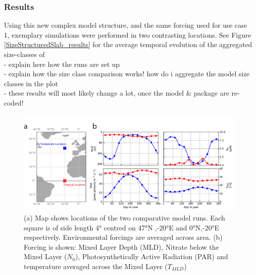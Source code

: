 \documentclass[template.tex]{subfiles}
\begin{document}
\subsubsection{Results}

Using this new complex model structure, and the same forcing used for use case 1, exemplary simulations were performed in two contrasting locations. 
See Figure \ref{SizeStructuredSlab_results} for the average temporal evolution of the aggregated size-classes of \\


- explain here how the runs are set up\\

- explain how the size class comparison works! how do i aggregate the model size classes in the plot\\

- these results will most likely change a lot, once the model & package are re-coded!\\


\clearpage

\begin{figure}[t]
\includegraphics[width=15cm]{Figures/firstdraft_plots/01_forcing_labeled.pdf}
\caption{(a) Map shows locations of the two comparative model runs. Each square is of side length 4° centred on 47°N ,-20°E and 0°N,-20°E respectively. Environmental forcings are averaged across area. (b) Forcing is shown: Mixed Layer Depth (MLD), Nitrate below the Mixed Layer ($N_0$), Photosynthetically Active Radiation (PAR) and temperature averaged across the Mixed Layer ($T_{MLD}$)}
\label{Figure:phydraforcing}
\end{figure}
\end{document}
